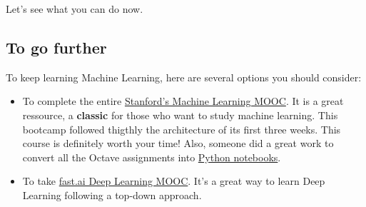 Let's see what you can do now.

\subsection*{To go further}
To keep learning Machine Learning, here are several options you should consider:
\begin{itemize}
      \item To complete the entire \href{https://www.coursera.org/learn/machine-learning/home/}{Stanford's Machine Learning MOOC}.
            It is a great ressource, a \textbf{classic} for those who want to study machine learning.
            This bootcamp followed thigthly the architecture of its first three weeks.
            This course is definitely worth your time!
            Also, someone did a great work to convert all the Octave assignments into \href{https://github.com/dibgerge/ml-coursera-python-assignments}{Python notebooks}.
      \item To take \href{https://course.fast.ai/}{fast.ai Deep Learning MOOC}.
            It's a great way to learn Deep Learning following a top-down approach.
\end{itemize}